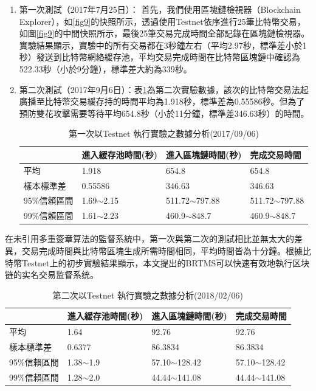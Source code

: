 		\begin{enumerate}
			\item 第一次測試（2017年7月25日）：
			首先，我們使用區塊鏈檢視器（Blockchain Explorer）\supercite{Blockchainexplorer:Ananalyticalprocessandinvestigationenvironmentforbitcoin}，如\ref{fig9}的快照所示，透過使用Testnet依序進行25筆比特幣交易，如圖\ref{fig9}的中間快照所示，最後25筆交易完成時間全部記錄在區塊鏈檢視器。實驗結果顯示，實驗中的所有交易都在3秒鐘左右（平均2.97秒，標準差小於1秒）發送到比特幣網絡緩存池，平均交易完成時間在比特幣區塊鏈中確認為522.33秒（小於9分鐘），標準差大約為339秒。

			\item 第二次測試（2017年9月6日）：表\ref{1general}為第二次實驗數據，該次的比特幣交易法起廣播至比特幣交易緩存持的時間平均為1.918秒，標準差為0.55586秒。但為了預防雙花攻擊需要等待平均654.8秒（小於11分鐘，標準差346.63秒）的時間。

				\begin{table}[htbp]
				\centering
				\caption{第一次以Testnet 執行實驗之數據分析(2017/09/06)}
				\label{1general}
				\begin{tabular}{|l|l|l|l|}
				\hline
				 & 進入緩存池時間(秒) & 進入區塊鏈時間(秒) & 完成交易時間 \\ \hline
				平均 & 1.918 & 654.8 & 654.8 \\ \hline
				樣本標準差 & 0.55586 & 346.63 & 346.63 \\ \hline
				95\%信賴區間 & 1.69$\sim$2.15 & 511.72$\sim$797.88 & 511.72$\sim$797.88 \\ \hline
				99\%信賴區間 & 1.61$\sim$2.23 & 460.9$\sim$848.7 & 460.9$\sim$848.7 \\ \hline
				\end{tabular}
				\end{table}
		\end{enumerate}

			在未引用多重簽章算法的監督系統中，第一次與第二次的測試相比並無太大的差異，交易完成時間與比特幣區塊生成所需時間相同，平均時間皆為十分鐘。根據比特幣Testnet上的初步實驗結果顯示，本文提出的BRTMS可以快速有效地執行区块链的实名交易监督系统。

			

			

			\begin{table}[htbp]
			\centering
			\caption{第二次以Testnet 執行實驗之數據分析(2018/02/06)}
			\label{2general}
			\begin{tabular}{|l|l|l|l|}
			\hline
			 & 進入緩存池時間(秒) & 進入區塊鏈時間(秒) & 完成交易時間 \\ \hline
			平均 & 1.64 & 92.76 & 92.76 \\ \hline
			樣本標準差 & 0.6377 & 86.3834 & 86.3834 \\ \hline
			95\%信賴區間 & 1.38$\sim$1.9 & 57.10$\sim$128.42 & 57.10$\sim$128.42 \\ \hline
			99\%信賴區間 & 1.28$\sim$2.0 & 44.44$\sim$141.08 & 44.44$\sim$141.08 \\ \hline
			\end{tabular}
			\end{table}

